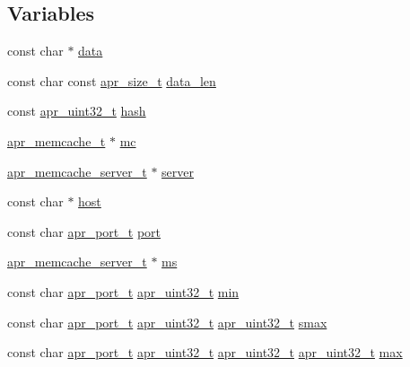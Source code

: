 \subsection*{Variables}
\begin{DoxyCompactItemize}
\item 
const char $\ast$ \hyperlink{group__APR__Util__MC_ga8f64897c7ccc5c13f276d1d07c4e7095}{data}
\item 
const char const \hyperlink{group__apr__platform_gaaa72b2253f6f3032cefea5712a27540e}{apr\+\_\+size\+\_\+t} \hyperlink{group__APR__Util__MC_ga371e964d98d4000f4bc080fa4ad81902}{data\+\_\+len}
\item 
const \hyperlink{group__apr__platform_ga558548a135d8a816c4787250744ea147}{apr\+\_\+uint32\+\_\+t} \hyperlink{group__APR__Util__MC_gaf1bbde160cd74eb856e5bc6da2bdd844}{hash}
\item 
\hyperlink{structapr__memcache__t}{apr\+\_\+memcache\+\_\+t} $\ast$ \hyperlink{group__APR__Util__MC_ga1cf8c9d89cfb411f224cae715e8c2aaa}{mc}
\item 
\hyperlink{structapr__memcache__server__t}{apr\+\_\+memcache\+\_\+server\+\_\+t} $\ast$ \hyperlink{group__APR__Util__MC_ga9fa10fd041b2a4019ec8a1bbc86b89b9}{server}
\item 
const char $\ast$ \hyperlink{group__APR__Util__MC_gae032e164f1daa754d6fbb79d59723931}{host}
\item 
const char \hyperlink{group__apr__network__io_gaa670a71960f6eb4fe0d0de2a1e7aba03}{apr\+\_\+port\+\_\+t} \hyperlink{group__APR__Util__MC_ga225c76c246a5cc263c5a2628eb99353e}{port}
\item 
\hyperlink{structapr__memcache__server__t}{apr\+\_\+memcache\+\_\+server\+\_\+t} $\ast$ \hyperlink{group__APR__Util__MC_gabcfc3d1de80e72f78d877d87639acdd2}{ms}
\item 
const char \hyperlink{group__apr__network__io_gaa670a71960f6eb4fe0d0de2a1e7aba03}{apr\+\_\+port\+\_\+t} \hyperlink{group__apr__platform_ga558548a135d8a816c4787250744ea147}{apr\+\_\+uint32\+\_\+t} \hyperlink{group__APR__Util__MC_gaed1ae724c786d088e40b9e6667e4e039}{min}
\item 
const char \hyperlink{group__apr__network__io_gaa670a71960f6eb4fe0d0de2a1e7aba03}{apr\+\_\+port\+\_\+t} \hyperlink{group__apr__platform_ga558548a135d8a816c4787250744ea147}{apr\+\_\+uint32\+\_\+t} \hyperlink{group__apr__platform_ga558548a135d8a816c4787250744ea147}{apr\+\_\+uint32\+\_\+t} \hyperlink{group__APR__Util__MC_ga5645303505286909d95c228588952953}{smax}
\item 
const char \hyperlink{group__apr__network__io_gaa670a71960f6eb4fe0d0de2a1e7aba03}{apr\+\_\+port\+\_\+t} \hyperlink{group__apr__platform_ga558548a135d8a816c4787250744ea147}{apr\+\_\+uint32\+\_\+t} \hyperlink{group__apr__platform_ga558548a135d8a816c4787250744ea147}{apr\+\_\+uint32\+\_\+t} \hyperlink{group__apr__platform_ga558548a135d8a816c4787250744ea147}{apr\+\_\+uint32\+\_\+t} \hyperlink{group__APR__Util__MC_ga38e7d1fc94ad8c6709d5b2243d2fd94b}{max}

\end{DoxyCompactItemize}
